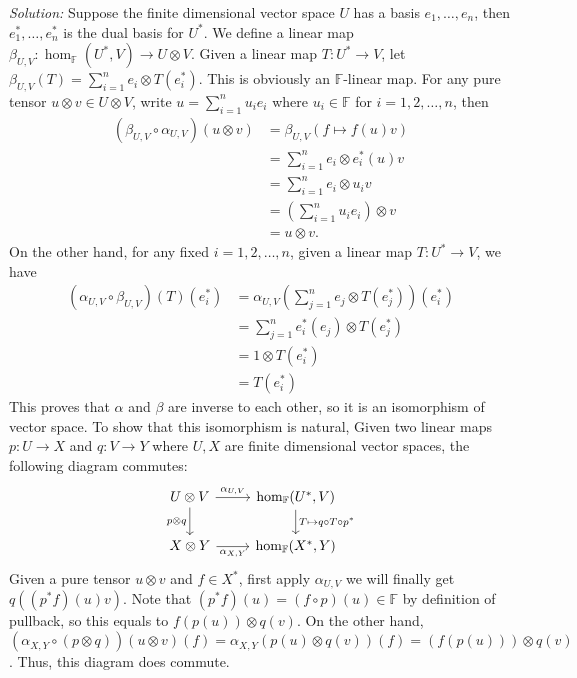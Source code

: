 \documentclass[a4paper, 12pt]{article}
\newenvironment{solution}
    {\textit{Solution:}}
    {}
\begin{document}
\begin{solution}
Suppose the finite dimensional vector space \(U\) has a basis \(e_1,\ldots,e_n\), then \(e_1^*,\ldots,e_n^*\) is the dual basis for \(U^*\). We define a linear map 
\(\beta_{U,V}: \hom_{\mathbb{F}}(U^*,V) \rightarrow U\otimes V\). Given a linear map \(T:U^*\rightarrow V\), let \(\beta_{U,V}(T)= \sum_{i=1}^n e_i\otimes T(e_i^*)\). This is obviously an \(\mathbb{F}\)-linear map. 
For any pure tensor \(u\otimes v\in U\otimes V\), write \(u=\sum_{i=1}^{n}u_ie_i\) where \(u_i\in \mathbb{F}\) for \(i=1,2,\ldots,n\), then 
\begin{align*}
	(\beta_{U,V}\circ \alpha_{U,V})(u\otimes v) & = \beta_{U,V}(f\mapsto f(u)v)\\ 
	                                            & =\sum_{i=1}^{n} e_i\otimes e_i^*(u)v\\ 
												& =\sum_{i=1}^{n} e_i\otimes u_i v\\ 
												& =(\sum_{i=1}^{n} u_i e_i)\otimes v\\ 
												& =u\otimes v.
\end{align*} 
On the other hand, for any fixed \(i=1,2,\ldots,n\), given a linear map \(T:U^*\rightarrow V\), we have  
\begin{align*}
(\alpha_{U,V}\circ \beta_{U,V})(T)(e_i^*) & = \alpha_{U,V}(\sum_{j=1}^{n}e_j\otimes T(e_j^*))(e_i^*)\\ 
                                          & =\sum_{j=1}^{n} e_i^*(e_j)\otimes T(e_j^*)\\ 
										  & =1\otimes T(e_i^*)\\ 
										  & =T(e_i^*)
\end{align*}
This proves that \(\alpha\) and \(\beta\) are inverse to each other, so it is an isomorphism of vector space. To show that this isomorphism is natural, 
Given two linear maps \(p:U\rightarrow X\) and \(q:V\rightarrow Y\) where \(U,X\) are finite dimensional vector spaces, the following diagram commutes:
\[\begin{tikzcd}
	{U\otimes V} & {\hom_{\mathbb{F}}(U^*,V)} \\
	{X\otimes Y} & {\hom_\mathbb{F}(X^*,Y)}
	\arrow["{\alpha_{U,V}}", from=1-1, to=1-2]
	\arrow["{p\otimes q}"', from=1-1, to=2-1]
	\arrow["{T\mapsto q\circ T\circ p^*}", from=1-2, to=2-2]
	\arrow["{\alpha_{X,Y}}"', from=2-1, to=2-2]
\end{tikzcd}\]
Given a pure tensor \(u\otimes v\) and \(f\in X^*\), first apply \(\alpha_{U,V}\) we will finally get \(q((p^*f)(u)v)\). Note that \((p^*f)(u)=(f\circ p)(u)\in \mathbb{F}\) by definition of pullback, so this equals to \(f(p(u))\otimes q(v)\). On the 
other hand, \((\alpha_{X,Y}\circ (p\otimes q))(u\otimes v)(f)=\alpha_{X,Y}(p(u)\otimes q(v))(f)=(f(p(u)))\otimes q(v)\). Thus, this diagram does commute.
\end{solution}
\end{document}
